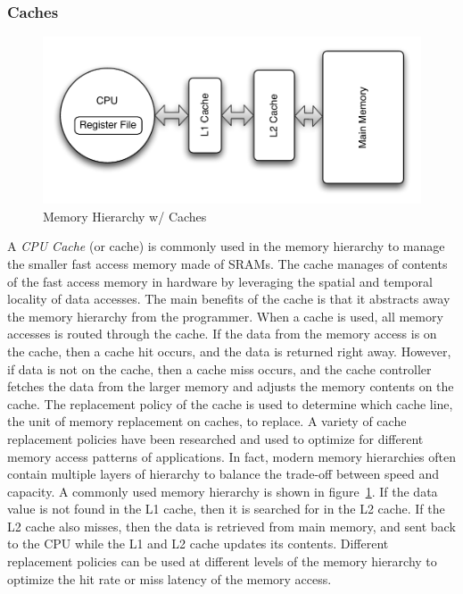 \subsubsection{Caches}
\begin{figure}
  \vspace{-20pt}
  \begin{center}
    \includegraphics[scale=.5]{figs/conventional_mem_hierarchy}
  \end{center}
  \vspace{-20pt}
  \caption{Memory Hierarchy w/ Caches}
  \label{fig:conventional_mem_hierarchy}
  \vspace{-10pt}
\end{figure}   
A \emph{CPU Cache} (or cache) is commonly used in the memory hierarchy to manage the smaller fast access memory made of SRAMs.
The cache manages of contents of the fast access memory in hardware by leveraging the spatial and temporal locality of data accesses. 
The main benefits of the cache is that it abstracts away the memory hierarchy from the programmer.
When a cache is used, all memory accesses is routed through the cache. 
If the data from the memory access is on the cache, then a cache hit occurs, and the data is returned right away.
However, if data is not on the cache, then a cache miss occurs, and the cache controller fetches the data from the larger memory and adjusts the memory contents on the cache. 
The replacement policy of the cache is used to determine which cache line, the unit of memory replacement on caches, to replace. 
A variety of cache replacement policies have been researched and used to optimize for different memory access patterns of applications. 
In fact, modern memory hierarchies often contain multiple layers of hierarchy to balance the trade-off between speed and capacity.
A commonly used memory hierarchy is shown in figure~\ref{fig:conventional_mem_hierarchy}.
If the data value is not found in the L1 cache, then it is searched for in the L2 cache. 
If the L2 cache also misses, then the data is retrieved from main memory, and sent back to the CPU while the L1 and L2 cache updates its contents.
Different replacement policies can be used at different levels of the memory hierarchy to optimize the hit rate or miss latency of the memory access.

